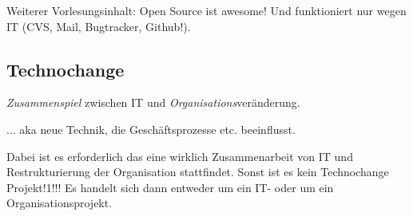 Weiterer Vorlesungsinhalt: Open Source ist awesome! Und funktioniert nur wegen IT (CVS, Mail, Bugtracker, Github!).

\subsection{Technochange}

\begin{center}{\large \emph{Zusammenspiel} zwischen IT und \emph{Organisations}veränderung.}

... aka neue Technik, die Geschäftsprozesse etc. beeinflusst.
\end{center}
Dabei ist es erforderlich das eine wirklich Zusammenarbeit von IT und Restrukturierung der Organisation stattfindet. Sonst ist es kein Technochange Projekt!1!!!
Es handelt sich dann entweder um ein IT- oder um ein Organisationsprojekt.